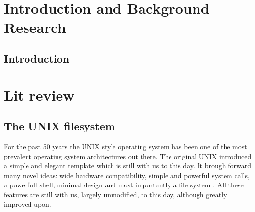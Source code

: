 \chapter{Introduction and Background Research}

    \section{Introduction}


\chapter{Lit review}
    \section{The UNIX filesystem}
        \label{sec_UFS}

        For the past 50 years the UNIX style operating system has been one of
        the most prevalent operating system architectures out there. The
        original UNIX introduced a simple and elegant template which is still
        with us to this day. It brough forward many novel ideas: wide hardware
        compatibility, simple and powerful system calls, a powerfull shell,
        minimal design and most importantly a file system \cite{UFS}. All these
        features are still with us, largely unmodified, to this day, although
        greatly improved upon.

